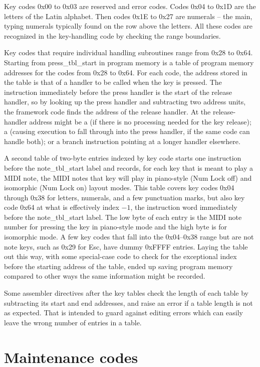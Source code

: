 Key codes 0x00 to 0x03 are reserved and error codes.  Codes 0x04 to 0x1D are
the letters of the Latin alphabet.  Then codes 0x1E to 0x27 are numerals --
the main, typing numerals typically found on the row above the letters.  All
these codes are recognized in the key-handling code by checking the range
boundaries.

Key codes that require individual handling subroutines range from 0x28 to
0x64.  Starting from press\_tbl\_start in program memory is a table of
program memory addresses for the codes from 0x28 to 0x64.  For each code,
the address stored in the table is that of a handler to be called when the
key is pressed.  The instruction immediately before the press handler is the
start of the release handler, so by looking up the press handler and
subtracting two address units, the framework code finds the address of the
release handler.  At the release-handler address might be a 
(if there is no processing needed for the key release); a 
(causing execution to fall through into the press handler, if the same code
can handle both); or a branch instruction pointing at a longer handler
elsewhere.

A second table of two-byte entries indexed by key code starts one
instruction before the note\_tbl\_start label and records, for each key that
is meant to play a MIDI note, the MIDI notes that key will play in
piano-style (Num Lock off) and isomorphic (Num Lock on) layout modes.  This
table covers key codes 0x04 through 0x38 for letters, numerals, and a few
punctuation marks, but also key code 0x64 at what is effectively index $-1$,
the instruction word immediately before the note\_tbl\_start label.  The low
byte of each entry is the MIDI note number for pressing the key in
piano-style mode and the high byte is for isomorphic mode.  A few key codes
that fall into the 0x04--0x38 range but are not note keys, such as 0x29 for
Esc, have dummy 0xFFFF entries.  Laying the table out this way, with some
special-case code to check for the exceptional index before the starting
address of the table, ended up saving program memory compared to other ways
the same information might be recorded.

Some assembler directives after the key tables check the length of each
table by subtracting its start and end addresses, and raise an error if a
table length is not as expected.  That is intended to guard against editing
errors which can easily leave the wrong number of entries in a table.

\section{Maintenance codes}


